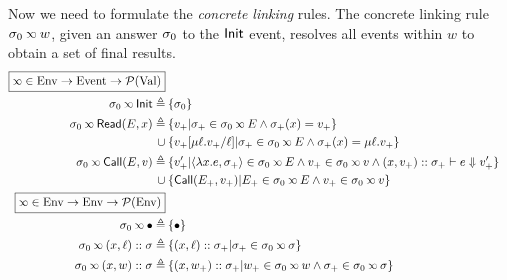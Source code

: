 Now we need to formulate the \emph{concrete linking} rules.
The concrete linking rule $\ctx_0\semlink w$, given an answer $\sigma_0$ to the $\textsf{Init}$ event, resolves all events within $w$ to obtain a set of final results.
\begin{align*}
	\fbox{$\semlink\in\Ctx\rightarrow\Event\rightarrow\pset(\Value)$}                                                                                                                                  \\
	\ctx_0\semlink\InitE\triangleq                         & \: \{\ctx_0\}                                                                                                                             \\
	\ctx_0\semlink\ReadE(\event,x)\triangleq               & \: \{v_+|\ctx_+\in\ctx_0\semlink\event\land\ctx_+(x)=v_+\}                                                                                \\
	\cup                                                   & \: \{v_+[\mu\ell.v_+/\ell]|\ctx_+\in\ctx_0\semlink E\land\ctx_+(x)=\mu\ell.v_+\}                                                          \\
	\ctx_0\semlink\CallE(\event,v)\triangleq               & \: \{v_+'|\langle\lambda x.e,\ctx_+\rangle\in\ctx_0\semlink E\land v_+\in\ctx_0\semlink v\land(x,v_+)\cons\ctx_+\vdash e\Downarrow v_+'\} \\
	\cup                                                   & \: \{\CallE(\event_+,v_+)|\event_+\in\ctx_0\semlink E\land v_+\in\ctx_0\semlink v\}                                                       \\
	\fbox{$\semlink\in\Ctx\rightarrow\Ctx\rightarrow\pset(\Ctx)$}                                                                                                                                      \\
	\ctx_0\semlink\bullet\triangleq                        & \: \{\bullet\}                                                                                                                            \\
	\ctx_0\semlink(x,\ell)\cons\ctx\triangleq              & \: \{(x,\ell)\cons\ctx_+|\ctx_+\in\ctx_0\semlink\ctx\}                                                                                    \\
	\ctx_0\semlink(x,w)\cons\ctx\triangleq                 & \: \{(x,w_+)\cons\ctx_+|w_+\in\ctx_0\semlink w\land\ctx_+\in\ctx_0\semlink\ctx\}                                                          \\

\end{align*}
